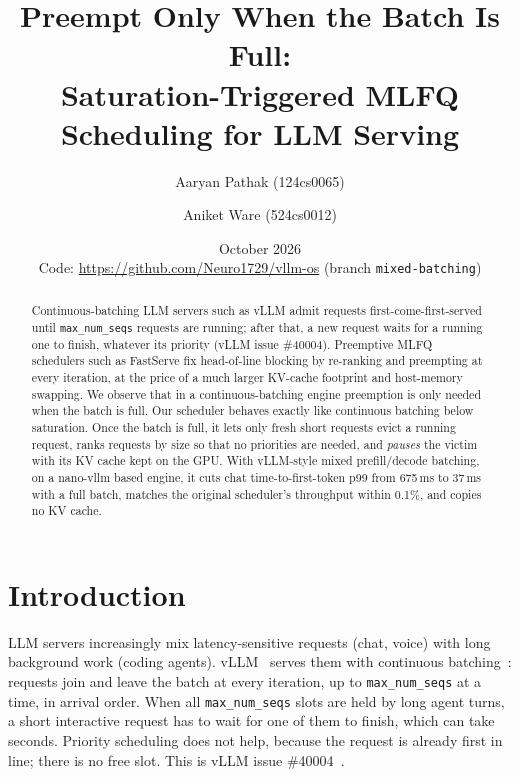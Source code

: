 \documentclass[11pt]{article}
\title{Preempt Only When the Batch Is Full:\\
Saturation-Triggered MLFQ Scheduling for LLM Serving}
\author{Aaryan Pathak (124cs0065) \and Aniket Ware (524cs0012)}
\date{October 2026\\[4pt]
\small Code: \url{https://github.com/Neuro1729/vllm-os} (branch \texttt{mixed-batching})}
\newcommand{\maxseqs}{\texttt{max\_num\_seqs}}
\begin{document}
\maketitle

\begin{abstract}
Continuous-batching LLM servers such as vLLM admit requests first-come-first-served until
\maxseqs{} requests are running; after that, a new request waits for a running one to finish,
whatever its priority (vLLM issue \#40004). Preemptive MLFQ schedulers such as FastServe fix
head-of-line blocking by re-ranking and preempting at every iteration, at the price of a much larger
KV-cache footprint and host-memory swapping. We observe that in a continuous-batching engine
preemption is only needed when the batch is full. Our scheduler behaves exactly like continuous
batching below saturation. Once the batch is full, it lets only fresh short requests evict a running
request, ranks requests by size so that no priorities are needed, and \emph{pauses} the victim with
its KV cache kept on the GPU. With vLLM-style mixed prefill/decode batching, on a nano-vllm based
engine, it cuts chat time-to-first-token p99 from 675\,ms to 37\,ms with a full batch, matches the
original scheduler's throughput within 0.1\%, and copies no KV cache.
\end{abstract}

\section{Introduction}

LLM servers increasingly mix latency-sensitive requests (chat, voice) with long background work
(coding agents). vLLM~\cite{vllm} serves them with continuous batching~\cite{orca}: requests join and
leave the batch at every iteration, up to \maxseqs{} at a time, in arrival order. When all
\maxseqs{} slots are held by long agent turns, a short interactive request has to wait for one of
them to finish, which can take seconds. Priority scheduling does not help, because the request is
already first in line; there is no free slot. This is vLLM issue \#40004~\cite{issue40004}.
\end{document}
